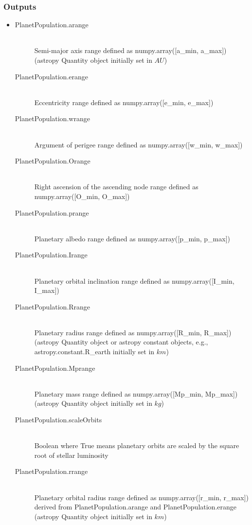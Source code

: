 \documentclass[cleanfoot]{asme2ej}
\begin{document}
\subsubsection*{Outputs}
\begin{itemize}
    \item
    \begin{description}
        \item[PlanetPopulation.arange] \hfill \\
        Semi-major axis range defined as numpy.array([a\_min, a\_max]) (astropy Quantity object initially set in $ AU $)
        \item[PlanetPopulation.erange] \hfill \\
        Eccentricity range defined as numpy.array([e\_min, e\_max])
        \item[PlanetPopulation.wrange] \hfill \\
        Argument of perigee range defined as numpy.array([w\_min, w\_max])
        \item[PlanetPopulation.Orange] \hfill \\
        Right ascension of the ascending node range defined as numpy.array([O\_min, O\_max])
        \item[PlanetPopulation.prange] \hfill \\
        Planetary albedo range defined as numpy.array([p\_min, p\_max])
        \item[PlanetPopulation.Irange] \hfill \\
        Planetary orbital inclination range defined as numpy.array([I\_min, I\_max])
        \item[PlanetPopulation.Rrange] \hfill \\
        Planetary radius range defined as numpy.array([R\_min, R\_max]) (astropy Quantity object or astropy constant objects, e.g., astropy.constant.R\_earth initially set in $ km $)
        \item[PlanetPopulation.Mprange] \hfill \\
        Planetary mass range defined as numpy.array([Mp\_min, Mp\_max]) (astropy Quantity object initially set in $ kg $)
        \item[PlanetPopulation.scaleOrbits] \hfill \\
        Boolean where True means planetary orbits are scaled by the square root of stellar luminosity
        \item[PlanetPopulation.rrange] \hfill \\
        Planetary orbital radius range defined as numpy.array([r\_min, r\_max]) derived from PlanetPopulation.arange and PlanetPopulation.erange (astropy Quantity object initially set in $ km $)
        
    \end{description}
\end{itemize}
\end{document}
